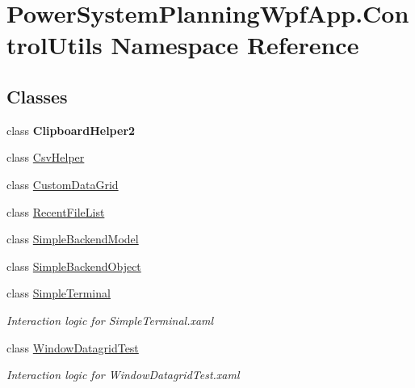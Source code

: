 \hypertarget{namespace_power_system_planning_wpf_app_1_1_control_utils}{}\section{Power\+System\+Planning\+Wpf\+App.\+Control\+Utils Namespace Reference}
\label{namespace_power_system_planning_wpf_app_1_1_control_utils}
\subsection*{Classes}
\begin{DoxyCompactItemize}
\item 
class {\bfseries Clipboard\+Helper2}
\item 
class \hyperlink{class_power_system_planning_wpf_app_1_1_control_utils_1_1_csv_helper}{Csv\+Helper}
\item 
class \hyperlink{class_power_system_planning_wpf_app_1_1_control_utils_1_1_custom_data_grid}{Custom\+Data\+Grid}
\item 
class \hyperlink{class_power_system_planning_wpf_app_1_1_control_utils_1_1_recent_file_list}{Recent\+File\+List}
\item 
class \hyperlink{class_power_system_planning_wpf_app_1_1_control_utils_1_1_simple_backend_model}{Simple\+Backend\+Model}
\item 
class \hyperlink{class_power_system_planning_wpf_app_1_1_control_utils_1_1_simple_backend_object}{Simple\+Backend\+Object}
\item 
class \hyperlink{class_power_system_planning_wpf_app_1_1_control_utils_1_1_simple_terminal}{Simple\+Terminal}
\begin{DoxyCompactList}\small\item\em Interaction logic for Simple\+Terminal.\+xaml \end{DoxyCompactList}\item 
class \hyperlink{class_power_system_planning_wpf_app_1_1_control_utils_1_1_window_datagrid_test}{Window\+Datagrid\+Test}
\begin{DoxyCompactList}\small\item\em Interaction logic for Window\+Datagrid\+Test.\+xaml \end{DoxyCompactList}\end{DoxyCompactItemize}
